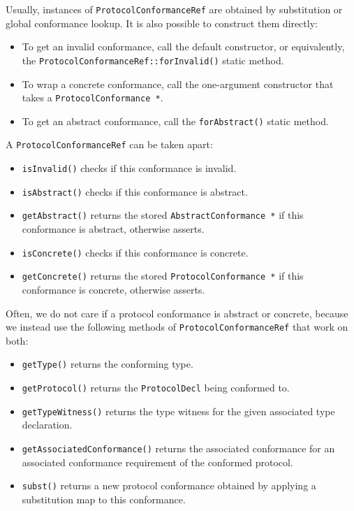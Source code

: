 \documentclass[../generics]{subfiles}
\begin{document}
Usually, instances of \texttt{ProtocolConformanceRef} are obtained by substitution or global conformance lookup. It is also possible to construct them directly:
\begin{itemize}
\item To get an invalid conformance, call the default constructor, or equivalently, the \texttt{ProtocolConformanceRef::forInvalid()} static method.
\item To wrap a concrete conformance, call the one-argument constructor that takes a \verb|ProtocolConformance *|.
\item To get an abstract conformance, call the \texttt{forAbstract()} static method.
\end{itemize}
A \texttt{ProtocolConformanceRef} can be taken apart:
\begin{itemize}
\item \texttt{isInvalid()} checks if this conformance is invalid.
\item \texttt{isAbstract()} checks if this conformance is abstract.
\item \texttt{getAbstract()} returns the stored \verb|AbstractConformance *| if this conformance is abstract, otherwise asserts.
\item \texttt{isConcrete()} checks if this conformance is concrete.
\item \texttt{getConcrete()} returns the stored \verb|ProtocolConformance *| if this conformance is concrete, otherwise asserts.
\end{itemize}
Often, we do not care if a protocol conformance is abstract or concrete, because we instead use the following methods of \texttt{ProtocolConformanceRef} that work on both:
\begin{itemize}
\item \texttt{getType()} returns the conforming type.
\item \texttt{getProtocol()} returns the \texttt{ProtocolDecl} being conformed to.
\item \texttt{getTypeWitness()} returns the type witness for the given associated type declaration.
\item \texttt{getAssociatedConformance()} returns the associated conformance for an associated conformance requirement of the conformed protocol.
\item \texttt{subst()} returns a new protocol conformance obtained by applying a substitution map to this conformance.
\end{itemize}
\end{document}
